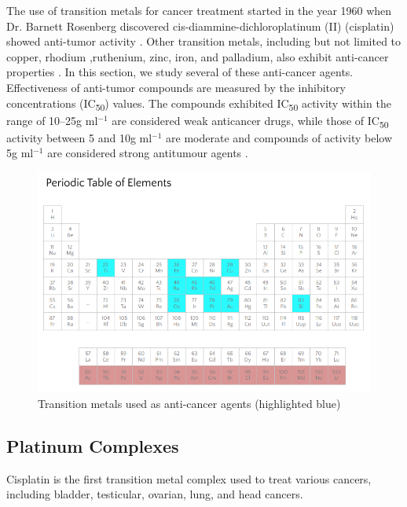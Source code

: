 The use of transition metals for cancer treatment started in the year 1960 when Dr. Barnett Rosenberg discovered cis-diammine-dichloroplatinum (II) (cisplatin) showed anti-tumor activity \cite{rosenberg1965inhibition}. Other transition metals, including but not limited to copper, rhodium ,ruthenium, zinc, iron, and palladium, also exhibit anti-cancer properties \cite{rafique2010transition}. In this section, we study several of these anti-cancer agents. Effectiveness of anti-tumor compounds are measured by the inhibitory concentrations (IC\textsubscript{50})  values. The compounds exhibited IC\textsubscript{50} activity within the range of 10–\SI{25}{\micro}g ml$^{-1}$ are considered weak anticancer drugs, while those of IC\textsubscript{50} activity between 5 and \SI{10}{\micro}g ml$^{-1}$ are moderate and compounds of activity below \SI{5}{\micro}g ml$^{-1}$ are considered strong antitumour agents \cite{mansour2016flubendazole}.


\begin{figure}[!ht]
        \centering
        \includegraphics[scale = 0.55]{periodictable.png}
        \caption{Transition metals used as anti-cancer agents (highlighted blue) \cite{rafique2010transition}}
        \label{fig:transition}
      \end{figure}
      
\subsection{Platinum Complexes}
Cisplatin is the first transition metal complex used to treat various cancers, including bladder, testicular, ovarian, lung, and head cancers\cite{dilruba2016platinum}. 

